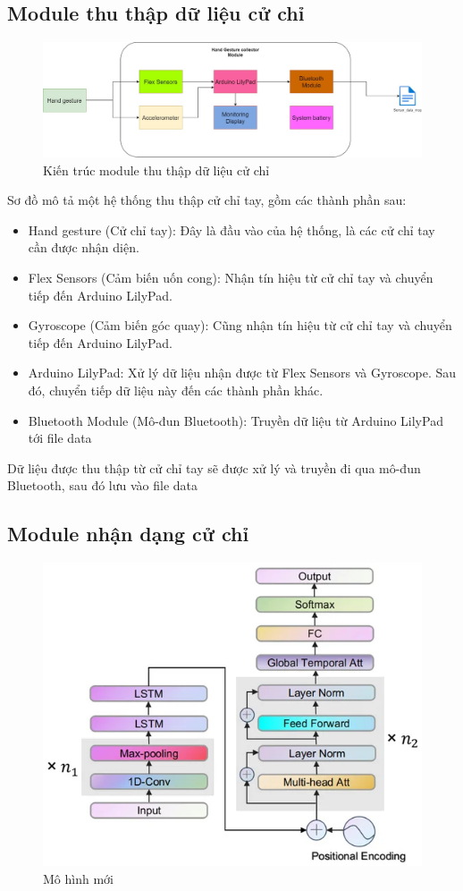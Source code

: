 \subsection{Module thu thập dữ liệu cử chỉ}
\begin{figure}[H]
    \centering
    \includegraphics[width=\textwidth,height=\textheight,keepaspectratio]{Images/Theoretical basis/HandGestureCollector.jpg}
    \caption{Kiến trúc module thu thập dữ liệu cử chỉ}
    \label{fig:enter-label}
\end{figure}

Sơ đồ mô tả một hệ thống thu thập cử chỉ tay, gồm các thành phần sau:
\begin{itemize}
\item Hand gesture (Cử chỉ tay): Đây là đầu vào của hệ thống, là các cử chỉ tay cần được nhận diện.
\item Flex Sensors (Cảm biến uốn cong): Nhận tín hiệu từ cử chỉ tay và chuyển tiếp đến Arduino LilyPad.
\item Gyroscope (Cảm biến góc quay): Cũng nhận tín hiệu từ cử chỉ tay và chuyển tiếp đến Arduino LilyPad.
\item Arduino LilyPad: Xử lý dữ liệu nhận được từ Flex Sensors và Gyroscope. Sau đó, chuyển tiếp dữ liệu này đến các thành phần khác.
\item Bluetooth Module (Mô-đun Bluetooth): Truyền dữ liệu từ Arduino LilyPad tới file data
\end{itemize}


Dữ liệu được thu thập từ cử chỉ tay sẽ được xử lý và truyền đi qua mô-đun Bluetooth, sau đó lưu vào file data
\subsection{Module nhận dạng cử chỉ}
\begin{figure}[H]
   \centering
   \includegraphics[width=0.8\linewidth]{Images/Architecture/SADeepConv.png}
   \caption{Mô hình mới}
   \label{fig:new-model}
\end{figure}


